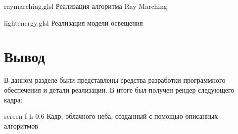 \clearpage

{raymarching.glsl} %
{} %
{Реализация алгоритма Ray Marching} %


\clearpage

{lightenergy.glsl} %
{} %
{Реализация модели освещения} %





\section{Вывод}

В данном разделе были представлены средства разработки программного обеспечения и детали реализации. В итоге был получен рендер следующего кадра:

{screen} %
{f} %
{h} %
{0.6\textwidth} %
{Кадр, облачного неба, созданный с помощью описанных алгоритмов} %

